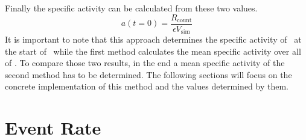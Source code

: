 \documentclass[encoding=utf8,british]{tumphthesis}
\begin{document}
Finally the specific activity can be calculated from these two values.
\begin{equation}
a(t=0) = \frac{R_{\mathrm{count}}}{\epsilon V_{\mathrm{sim}}}
\label{equ:ActivityDieZweite}
\end{equation}
It is important to note that this approach determines the specific activity of \Kr\ at the start of \PII\ while the first method calculates the mean specific activity over all of \PII.
To compare those two results, in the end a mean specific activity of the second method has to be determined.
The following sections will focus on the concrete implementation of this method and the values determined by them.
\\

\section{Event Rate}
\label{sec:EventAct}
\end{document}
